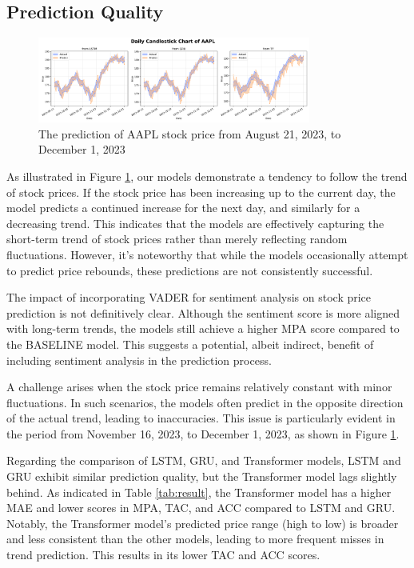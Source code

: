\subsection{Prediction Quality}

\begin{figure}
	\centering
	\includegraphics[width=0.8\textwidth]{Fig/unstable_AAPL.png}
	\caption{The prediction of AAPL stock price from August 21, 2023, to December 1, 2023}
	\label{fig:AAPL}
\end{figure}

As illustrated in Figure \ref{fig:AAPL}, our models demonstrate a tendency to follow the trend of stock prices. 
If the stock price has been increasing up to the current day, the model predicts a continued increase for the next day, and similarly for a decreasing trend. 
This indicates that the models are effectively capturing the short-term trend of stock prices rather than merely reflecting random fluctuations. 
However, it's noteworthy that while the models occasionally attempt to predict price rebounds, these predictions are not consistently successful.

The impact of incorporating VADER for sentiment analysis on stock price prediction is not definitively clear. 
Although the sentiment score is more aligned with long-term trends, the models still achieve a higher MPA score compared to the BASELINE model. 
This suggests a potential, albeit indirect, benefit of including sentiment analysis in the prediction process.

A challenge arises when the stock price remains relatively constant with minor fluctuations. 
In such scenarios, the models often predict in the opposite direction of the actual trend, leading to inaccuracies. 
This issue is particularly evident in the period from November 16, 2023, to December 1, 2023, as shown in Figure \ref{fig:AAPL}.

Regarding the comparison of LSTM, GRU, and Transformer models, LSTM and GRU exhibit similar prediction quality, but the Transformer model lags slightly behind. 
As indicated in Table \ref{tab:result}, the Transformer model has a higher MAE and lower scores in MPA, TAC, and ACC compared to LSTM and GRU. 
Notably, the Transformer model's predicted price range (high to low) is broader and less consistent than the other models, leading to more frequent misses in trend prediction. This results in its lower TAC and ACC scores.

